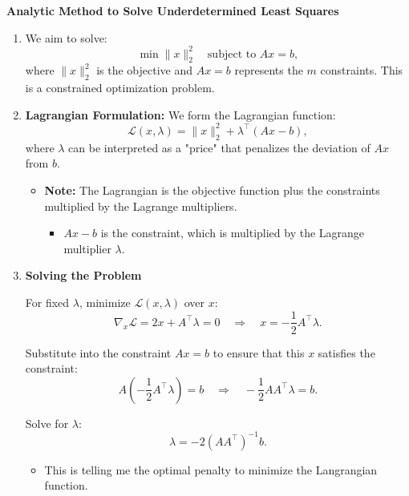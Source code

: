 \begin{derivation}
    \textbf{Analytic Method to Solve Underdetermined Least Squares}

    \begin{enumerate}
        \item We aim to solve:
        \[
        \min \|x\|_2^2 \quad \text{subject to } A x = b,
        \]
        where \(\|x\|_2^2\) is the objective and \(A x = b\) represents the \(m\) constraints. This is a constrained optimization problem.
        
        \item \textbf{Lagrangian Formulation:} We form the Lagrangian function:
        \[
        \mathcal{L}(x, \lambda) = \|x\|_2^2 + \lambda^\top (A x - b),
        \]
        where \(\lambda\) can be interpreted as a "price" that penalizes the deviation of \(A x\) from \(b\).
        \begin{itemize}
            \item \textbf{Note:} The Lagrangian is the objective function plus the constraints multiplied by the Lagrange multipliers.
            \begin{itemize}
                \item $Ax-b$ is the constraint, which is multiplied by the Lagrange multiplier $\lambda$.
            \end{itemize}
        \end{itemize}
        
        \item \textbf{Solving the Problem}
        
        For fixed \(\lambda\), minimize \(\mathcal{L}(x, \lambda)\) over \(x\):
        \[
        \nabla_x \mathcal{L} = 2x + A^\top \lambda = 0 \quad \Rightarrow \quad x = -\frac{1}{2} A^\top \lambda.
        \]
        
        Substitute into the constraint \(A x = b\) to ensure that this $x$ satisfies the constraint:
        \[
        A \left(-\frac{1}{2} A^\top \lambda \right) = b \quad \Rightarrow \quad -\frac{1}{2} A A^\top \lambda = b.
        \]
        
        Solve for \(\lambda\):
        \[
        \lambda = -2 (A A^\top)^{-1} b.
        \]
        \begin{itemize}
            \item This is telling me the optimal penalty to minimize the Langrangian function.
        \end{itemize}
        

\end{enumerate}
\end{derivation}
